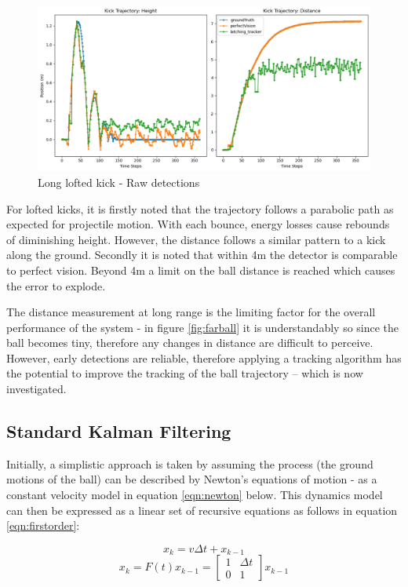 \documentclass[a4paper,twoside,12pt]{report}
\begin{document}
\begin{figure}[h!]
\begin{center}
\includegraphics[width=14cm]{images/raw_loft_long.png}
\caption{Long lofted kick - Raw detections}
\label{fig:rawloftlong}
\end{center}
\end{figure}

For lofted kicks, it is firstly noted that the trajectory follows a parabolic path as expected for projectile motion. With each bounce, energy losses cause rebounds of diminishing height. However, the distance follows a similar pattern to a kick along the ground. Secondly it is noted that within 4m the detector is comparable to perfect vision. Beyond 4m a limit on the ball distance is reached which causes the error to explode. 

The distance measurement at long range is the limiting factor for the overall performance of the system - in figure \ref{fig:farball} it is understandably so since the ball becomes tiny, therefore any changes in distance are difficult to perceive. However, early detections are reliable, therefore applying a tracking algorithm has the potential to improve the tracking of the ball trajectory -- which is now investigated.

\subsection{Standard Kalman Filtering}

Initially, a simplistic approach is taken by assuming the process (the ground motions of the ball) can be described by Newton's equations of motion - as a constant velocity model in equation \ref{eqn:newton} below. This dynamics model can then be expressed as a linear set of recursive equations as follows in equation \ref{eqn:firstorder}:

\begin{equation} 
x_k=v\Delta t + x_{k-1}
\label{eqn:newton}
\end{equation}
\begin{equation} 
x_k
=
F(t)x_{k-1}
=
\begin{bmatrix}
    1 & \Delta t \\
    0 & 1 
\end{bmatrix}
x_{k-1}
\label{eqn:firstorder}
\end{equation}
\end{document}
